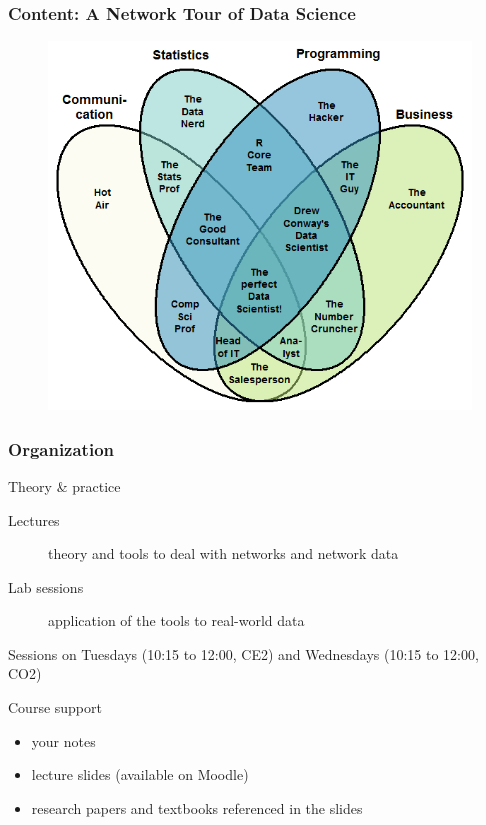\documentclass[aspectratio=169]{beamer}
\begin{document}
\begin{frame}
	\frametitle{Content: A Network Tour of \textbf{Data Science}}
	\begin{figure}
		\includegraphics[height=0.85\textheight]{data_scientist}
	\end{figure}
\end{frame}


\begin{frame}
	\frametitle{Organization}
	\begin{block}{Theory \& practice}
	\begin{description}
		\item[Lectures] theory and tools to deal with networks and network data
		\item[Lab sessions] application of the tools to real-world data
	\end{description}
	\end{block}
	\vfill
	Sessions on Tuesdays (10:15 to 12:00, CE2) and Wednesdays (10:15 to 12:00, CO2)
	\vfill
	\begin{block}{Course support}
	\begin{itemize}
		\item your notes
		\item lecture slides (available on Moodle)
		\item research papers and textbooks referenced in the slides
	\end{itemize}
	\end{block}
\end{frame}
\end{document}
